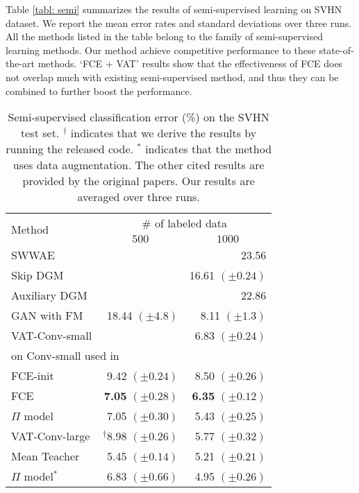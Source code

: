 \documentclass[10pt,twocolumn,letterpaper]{article}
\begin{document}
Table \ref{tabl: semi} summarizes the results of semi-supervised learning on SVHN dataset. We report the mean error rates and standard deviations over three runs. All the methods listed in the table belong to the family of semi-supervised learning methods. Our method achieve competitive performance to these state-of-the-art methods. \lq FCE + VAT' results show that the effectiveness of FCE does not overlap much with existing semi-supervised method, and thus they can be combined to further boost the performance. 
\begin{table}
\centering
 \caption{Semi-supervised classification error (\%) on the SVHN test set. $^\dagger$ indicates that we derive the results by running the released code. $^*$ indicates that the method uses data augmentation. The other cited results are provided by the original papers. Our results are averaged over three runs. }  
\footnotesize
 \begin{tabular}{lrr}
    \toprule
     \multirow{2}{*}{Method}   & \multicolumn{2}{c}{\# of labeled data} \\
     & \multicolumn{1}{c}{$500$} & \multicolumn{1}{c}{$1000$}\\
        \midrule
     SWWAE \cite{zhao2015stacked}       & & 23.56\\
     Skip DGM \cite{maaloe2016auxiliary} && 16.61 $(\pm 0.24)$ \\
     Auxiliary DGM \cite{maaloe2016auxiliary} &   & 22.86\\
     GAN with FM \cite{salimans2016improved} & 18.44 $(\pm 4.8)$ & 8.11 $(\pm 1.3)$\\
     VAT-Conv-small \cite{miyato2018virtual}  & & 6.83 $(\pm 0.24)$ \\
     \midrule
     \multicolumn{2}{l}{on Conv-small used in \cite{salimans2016improved, miyato2018virtual}}\\
     FCE-init & 9.42 $(\pm 0.24)$ &  8.50 $(\pm 0.26)$\\
     FCE & {\bf 7.05} $(\pm 0.28)$ & {\bf 6.35} $(\pm 0.12)$\\
     \midrule
     $\Pi$ model \cite{laine2016temporal} &7.05 $(\pm 0.30)$& 5.43 $(\pm 0.25)$\\
      VAT-Conv-large \cite{miyato2018virtual} & $^\dagger$8.98 $(\pm 0.26)$ & 5.77 $(\pm 0.32)$\\
           Mean Teacher \cite{tarvainen2017mean} & 5.45 $(\pm 0.14)$ & 5.21 $(\pm 0.21)$ \\
     $\Pi$ model$^*$ \cite{laine2016temporal} & 6.83 $(\pm 0.66)$& 4.95 $(\pm 0.26)$\\

\end{tabular}
\end{table}
\end{document}

